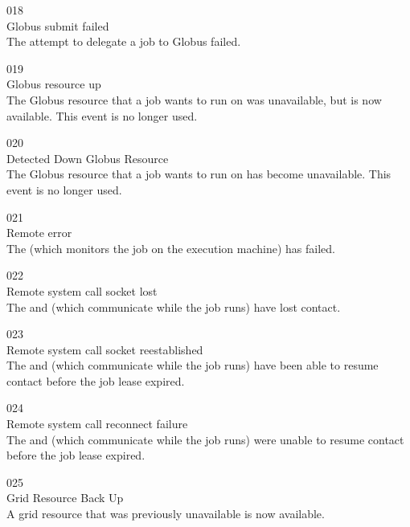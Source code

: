 \noindent{} 018 \\
 Globus submit failed \\
 The attempt to delegate a job to Globus
failed. 

\noindent{} 019 \\
 Globus resource up \\
 The Globus resource that a job wants to run
on was unavailable, but is now available.
This event is no longer used.

\noindent{} 020 \\
 Detected Down Globus Resource \\
 The Globus resource that a job wants to run
on has become unavailable. 
This event is no longer used.

\noindent{} 021 \\
 Remote error \\
 The  (which monitors the job
on the execution machine) has failed.

\noindent{} 022 \\
 Remote system call socket lost \\
 The  and 
(which communicate while the job runs) have lost contact.

\noindent{} 023 \\
 Remote system call socket reestablished \\
 The  and 
(which communicate while the job runs) have been able to resume
contact before the job lease expired.

\noindent{} 024 \\
 Remote system call reconnect failure \\
 The  and 
(which communicate while the job runs) were unable to resume
contact before the job lease expired.

\noindent{} 025 \\
 Grid Resource Back Up \\
 A grid resource that was previously
unavailable is now available.

